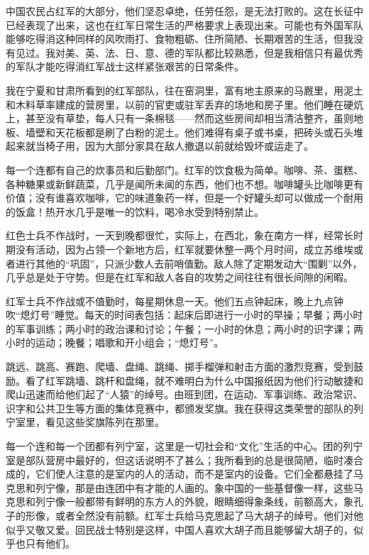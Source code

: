 \documentclass[10pt]{book}
\begin{document}
中国农民占红军的大部分，他们坚忍卓绝，任劳任怨，是无法打败的。这在长征中已经表现了出来，这也在红军日常生活的严格要求上表现出来。可能也有外国军队能够吃得消这种同样的风吹雨打、食物粗砺、住所简陋、长期艰苦的生活，但我没有见过。我对美、英、法、日、意、德的军队都比较熟悉，但是我相信只有最优秀的军队才能吃得消红军战士这样紧张艰苦的日常条件。

我在宁夏和甘肃所看到的红军部队，往在窑洞里，富有地主原来的马厩里，用泥土和木料草率建成的营房里，以前的官吏或驻军丢弃的场地和房子里。他们睡在硬炕上，甚至没有草垫，每人只有一条棉毯——然而这些房间却相当清洁整齐，虽则地板、墙壁和天花板都是刷了白粉的泥土。他们难得有桌子或书桌，把砖头或石头堆起来就当椅子用，因为大部分家具在敌人撤退以前就给毁坏或运走了。

每一个连都有自己的炊事员和后勤部门。红军的饮食极为简单。咖啡、茶、蛋糕、各种糖果或新鲜蔬菜，几乎是闻所未闻的东西，他们也不想。咖啡罐头比咖啡更有价值；没有谁喜欢咖啡，它的味道象药一样，但是一个好罐头却可以做成一个耐用的饭盒！热开水几乎是唯一的饮料，喝冷水受到特别禁止。

红色士兵不作战时，一天到晚都很忙，实际上，在西北，象在南方一样，经常长时期没有活动，因为占领一个新地方后，红军就要休整一两个月时间，成立苏维埃或者进行其他的“巩固”，只派少数人去前哨值勤。敌人除了定期发动大“围剿”以外，几乎总是处于守势。但是在红军和敌人各自的攻势之间往往有很长间隙的闲暇。

红军士兵不作战或不值勤时，每星期休息一天。他们五点钟起床，晚上九点钟吹“熄灯号”睡觉。每天的时间表包括：起床后即进行一小时的早操；早餐；两小时的军事训练；两小时的政治课和讨论；午餐；一小时的休息；两小时的识字课；两小时的运动；晚餐；唱歌和开小组会；“熄灯号”。

跳远、跳高、赛跑、爬墙、盘绳、跳绳、掷手榴弹和射击方面的激烈竞赛，受到鼓励。看了红军跳墙、跳杆和盘绳，就不难明白为什么中国报纸因为他们行动敏捷和爬山迅速而给他们起了“人猿”的绰号。由班到团，在运动、军事训练、政治常识、识字和公共卫生等方面的集体竞赛中，都颁发奖旗。我在获得这类荣誉的部队的列宁室里，看见这些奖旗陈列在那里。

每一个连和每一个团都有列宁室，这里是一切社会和“文化”生活的中心。团的列宁室是部队营房中最好的，但这话说明不了甚么；我所看到的总是很简陋，临时凑合成的，它们使人注意的是室内的人的活动，而不是室内的设备。它们全都悬挂了马克思和列宁像，那是由连团中有才能的人画的。象中国的一些基督像一样，这些马克思和列宁像一般都带有鲜明的东方人的外貌，眼睛细得象条线，前额高大，象孔子的形像，或者全然没有前额。红军士兵给马克思起了马大胡子的绰号。他们对他似乎又敬又爱。回民战士特别是这样，中国人喜欢大胡子而且能够留大胡子的，似乎也只有他们。
\end{document}
